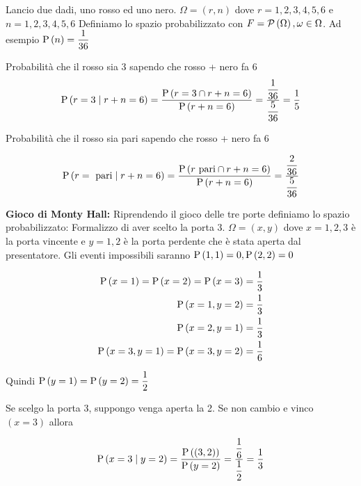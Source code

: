 \begin{exrc}
	Lancio due dadi, uno rosso ed uno nero.
	$ \Omega = (r, n) $ dove $ r = 1,2,3,4,5,6 $ e $ n = 1,2,3,4,5,6 $ 
	Definiamo lo spazio probabilizzato con $ F = \mathcal{P}\left(\Omega\right), \omega \in \Omega $. Ad esempio $ \text{P}\left(n\right) = \dfrac{1}{36} $
	
	Probabilità che il rosso sia 3 sapendo che rosso + nero fa 6
	\begin{equation*}
	\text{P}\left(r=3  \mid  r+n = 6\right) = \dfrac{\text{P}\left(r=3 \cap r + n = 6\right)}{\text{P}\left(r+n=6\right)} = \dfrac{\dfrac{1}{36}}{\dfrac{5}{36}} = \dfrac{1}{5}
	\end{equation*}
	
	Probabilità che il rosso sia pari sapendo che rosso + nero fa 6
	
	\begin{equation*}
	\text{P}\left(r = \text{ pari}  \mid  r+n = 6\right) = \dfrac{\text{P}\left(r \text{ pari} \cap r+n = 6\right)}{\text{P}\left(r+n = 6\right)} = \dfrac{\dfrac{2}{36}}{\dfrac{5}{36}}
	\end{equation*}
\end{exrc}


\begin{exrc}
	\textbf{Gioco di Monty Hall:}
	Riprendendo il gioco delle tre porte definiamo lo spazio probabilizzato: Formalizzo di aver scelto la porta 3. $ \Omega = (x,y) $ dove $ x = 1,2,3 $ è la porta vincente e $ y = 1,2 $ è la porta perdente che è stata aperta dal presentatore. Gli eventi impossibili saranno $ \text{P}\left(1,1\right) = 0, \text{P}\left(2,2\right) = 0 $
	
	\begin{equation*}
	\begin{aligned}
	\text{P}\left(x=1\right) = \text{P}\left(x=2\right) = \text{P}\left(x=3\right) = \dfrac{1}{3} \\
	\text{P}\left(x=1,y=2\right) = \dfrac{1}{3} \\
	\text{P}\left(x=2,y=1\right) = \dfrac{1}{3} \\
	\text{P}\left(x=3,y=1\right) = \text{P}\left(x=3,y=2\right) = \dfrac{1}{6} 
	\end{aligned}
	\end{equation*}
\end{exrc}





Quindi $ \text{P}\left(y=1\right) = \text{P}\left(y=2\right) = \dfrac{1}{2} $

Se scelgo la porta 3, suppongo venga aperta la 2. Se non cambio e vinco $ (x = 3) $ allora

\begin{equation*}
	\text{P}\left(x=3  \mid  y=2\right) = \dfrac{\text{P}\left((3,2)\right)}{\text{P}\left(y=2\right)} = \dfrac{\dfrac{1}{6}}{\dfrac{1}{2}} = \dfrac{1}{3}
\end{equation*}


